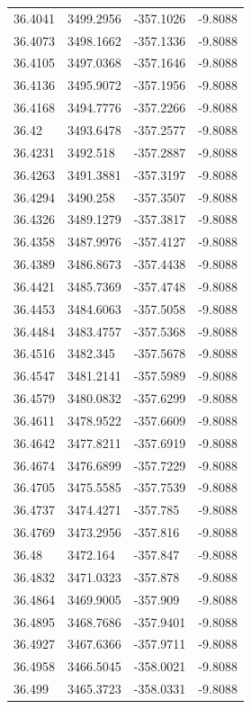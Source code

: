\begin{table}[H]
\begin{tabular}{llll}
36.4041 & 3499.2956 & -357.1026 & -9.8088 \\
36.4073 & 3498.1662 & -357.1336 & -9.8088 \\
36.4105 & 3497.0368 & -357.1646 & -9.8088 \\
36.4136 & 3495.9072 & -357.1956 & -9.8088 \\
36.4168 & 3494.7776 & -357.2266 & -9.8088 \\
36.42 & 3493.6478 & -357.2577 & -9.8088 \\
36.4231 & 3492.518 & -357.2887 & -9.8088 \\
36.4263 & 3491.3881 & -357.3197 & -9.8088 \\
36.4294 & 3490.258 & -357.3507 & -9.8088 \\
36.4326 & 3489.1279 & -357.3817 & -9.8088 \\
36.4358 & 3487.9976 & -357.4127 & -9.8088 \\
36.4389 & 3486.8673 & -357.4438 & -9.8088 \\
36.4421 & 3485.7369 & -357.4748 & -9.8088 \\
36.4453 & 3484.6063 & -357.5058 & -9.8088 \\
36.4484 & 3483.4757 & -357.5368 & -9.8088 \\
36.4516 & 3482.345 & -357.5678 & -9.8088 \\
36.4547 & 3481.2141 & -357.5989 & -9.8088 \\
36.4579 & 3480.0832 & -357.6299 & -9.8088 \\
36.4611 & 3478.9522 & -357.6609 & -9.8088 \\
36.4642 & 3477.8211 & -357.6919 & -9.8088 \\
36.4674 & 3476.6899 & -357.7229 & -9.8088 \\
36.4705 & 3475.5585 & -357.7539 & -9.8088 \\
36.4737 & 3474.4271 & -357.785 & -9.8088 \\
36.4769 & 3473.2956 & -357.816 & -9.8088 \\
36.48 & 3472.164 & -357.847 & -9.8088 \\
36.4832 & 3471.0323 & -357.878 & -9.8088 \\
36.4864 & 3469.9005 & -357.909 & -9.8088 \\
36.4895 & 3468.7686 & -357.9401 & -9.8088 \\
36.4927 & 3467.6366 & -357.9711 & -9.8088 \\
36.4958 & 3466.5045 & -358.0021 & -9.8088 \\
36.499 & 3465.3723 & -358.0331 & -9.8088 \\

\end{tabular}
\end{table}
